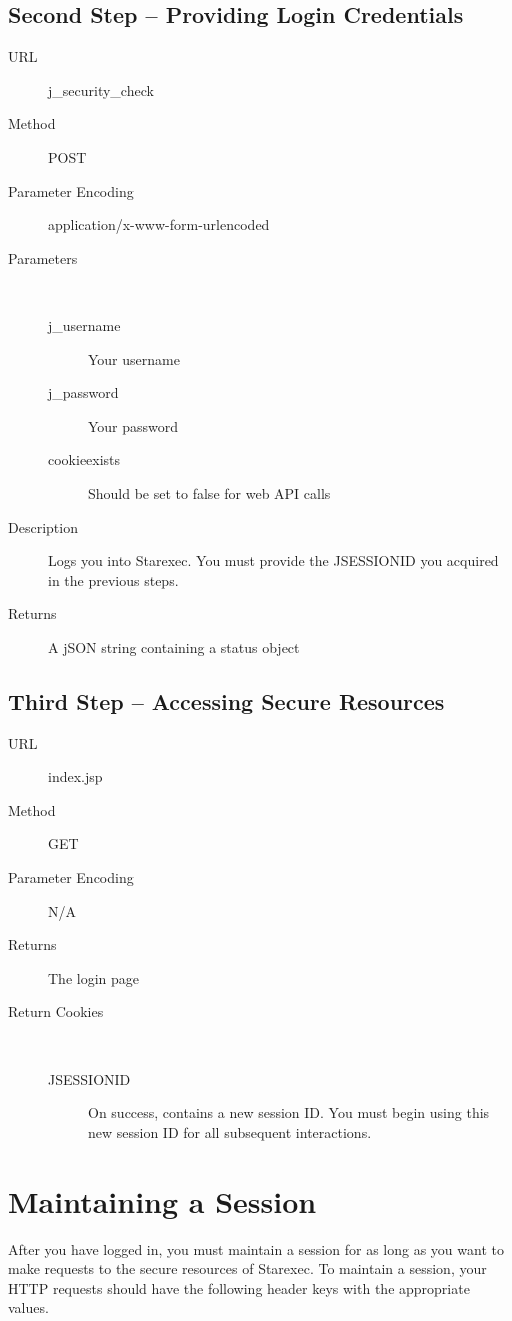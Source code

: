 \subsection{Second Step -- Providing Login Credentials}

\begin{description}
\item [URL] j\_security\_check
\item [Method] POST
\item [Parameter Encoding] application/x-www-form-urlencoded
\item [Parameters] \
    \begin{description}
    \item [j\_username]  Your username
    \item [j\_password] \type{String} Your password
    \item [cookieexists]  Should be set to false for web API calls
    \end{description}

\item [Description] Logs you into Starexec. You must provide the JSESSIONID you acquired in the previous steps.
\item [Returns] A jSON string containing a status object
\end{description}

\subsection{Third Step -- Accessing Secure Resources}

\begin{description}
\item [URL] index.jsp
\item [Method] GET
\item [Parameter Encoding] N/A
\item [Returns] The login page
\item [Return Cookies] \
	\begin{description}
	\item [JSESSIONID]  On success, contains a new session ID. You must begin using this new session ID for all subsequent interactions.
	\end{description}
\end{description}

\section{Maintaining a Session}
After you have logged in, you must maintain a session for as long as you want to make requests to the secure resources of Starexec. To maintain a session, your HTTP requests should have the following header keys with the appropriate values.

